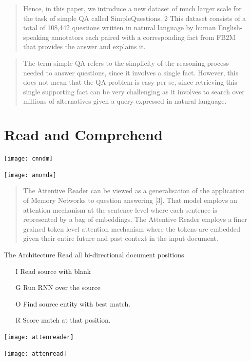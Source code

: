 \documentclass{beamer}
\begin{document}
\begin{frame}
  \begin{quote}
    Hence, in this paper, we introduce a new dataset of much larger
    scale for the task of simple QA called SimpleQuestions.  2 This
    dataset consists of a total of 108,442 questions written in
    natural language by human English-speaking annotators each paired
    with a corresponding fact from FB2M that provides the answer and
    explains it.
  \end{quote}
\end{frame}



\begin{frame}
  \begin{quote}
    The term simple QA refers to the simplicity of
the reasoning process needed to answer questions,
since it involves a single fact. However, this does
not mean that the QA problem is easy per se, since
retrieving this single supporting fact can be very
challenging as it involves to search over millions
of alternatives given a query expressed in natural
language.
  \end{quote}
\end{frame}


\section{Read and Comprehend}
\begin{frame}
  \texttt{[image: cnndm]}
\end{frame}


\begin{frame}
  \texttt{[image: anonda]}
\end{frame}

\begin{frame}
  \begin{quote}
    The Attentive Reader can be viewed as a generalisation of the application of Memory Networks to
question answering [3]. That model employs an attention mechanism at the sentence level where
each sentence is represented by a bag of embeddings. The Attentive Reader employs a finer grained
token level attention mechanism where the tokens are embedded given their entire future and past
context in the input document.
  \end{quote}
\end{frame}

\begin{frame}{The Architecture}
  Read all bi-directional document positions 
  \begin{itemize}
  \item[I] Read source with blank
  \item[G] Run RNN over the source
  \item[O] Find source entity with best match.
  \item[R] Score match at that position.
  \end{itemize}
\end{frame}


\begin{frame}
  \texttt{[image: attenreader]}
\end{frame}


\begin{frame}
  \texttt{[image: attenread]}
\end{frame}
\end{document}
